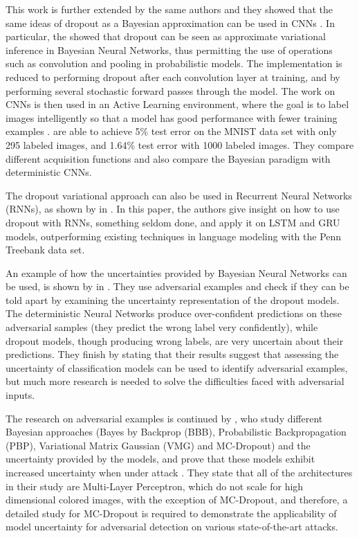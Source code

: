 This work is further extended by the same authors and they showed that the same ideas of dropout as a Bayesian approximation can be used in CNNs \cite{gal2015bayesian}. In particular, the showed that dropout can be seen as approximate variational inference in Bayesian Neural Networks, thus permitting the use of operations such as convolution and pooling in probabilistic models. The implementation is reduced to performing dropout after each convolution layer at training, and by performing several stochastic forward passes through the model. The work on CNNs is then used in an Active Learning environment, where the goal is to label images intelligently so that a model has good performance with fewer training examples \cite{Gal2016Active}. \citeauthor{Gal2016Active} are able to achieve 5\% test error on the MNIST data set with only 295 labeled images, and 1.64\% test error with 1000 labeled images. They compare different acquisition functions and also compare the Bayesian paradigm with deterministic CNNs.

The dropout variational approach can also be used in Recurrent Neural Networks (RNNs), as shown by \citeauthor{gal2016theoretically} in \cite{gal2016theoretically}. In this paper, the authors give insight on how to use dropout with RNNs, something seldom done, and apply it on LSTM and GRU models, outperforming existing techniques in language modeling with the Penn Treebank data set.

An example of how the uncertainties provided by Bayesian Neural Networks can be used, is shown by \citeauthor{li2017dropout} in \cite{li2017dropout}. They use adversarial examples and check if they can be told apart by examining the uncertainty representation of the dropout models. The deterministic Neural Networks produce over-confident predictions on these adversarial samples (they predict the wrong label very confidently), while dropout models, though producing wrong labels, are very uncertain about their predictions. They finish by stating that their results suggest that assessing the uncertainty of classification models can be used to identify adversarial examples, but much more research is needed to solve the difficulties faced with adversarial inputs.

The research on adversarial examples is continued by \citeauthor{rawat2017adversarial}, who study different Bayesian approaches (Bayes by Backprop (BBB), Probabilistic Backpropagation (PBP), Variational Matrix Gaussian (VMG) and MC-Dropout) and the uncertainty provided by the models, and prove that these models exhibit increased uncertainty when under attack \cite{rawat2017adversarial}. They state that all of the architectures in their study are Multi-Layer Perceptron, which do not scale for high dimensional colored images, with the exception of MC-Dropout, and therefore, a detailed study for MC-Dropout is required to demonstrate the applicability of model uncertainty for adversarial detection on various state-of-the-art attacks.

